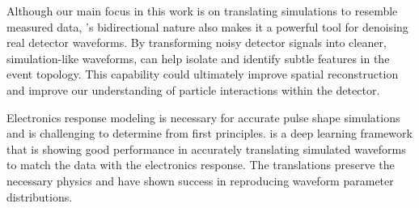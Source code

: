 Although our main focus in this work is on translating simulations to resemble measured data, {\cpunet}’s bidirectional nature also makes it a powerful tool for denoising real detector waveforms. By transforming noisy detector signals into cleaner, simulation-like waveforms, {\cpunet} can help isolate and identify subtle features in the event topology. This capability could ultimately improve spatial reconstruction and improve our understanding of particle interactions within the detector.

Electronics response modeling is necessary for accurate pulse shape simulations and is challenging to determine from first principles. {\cpunet} is a deep learning framework that is showing good performance in accurately translating simulated waveforms to match the data with the electronics response. The translations preserve the necessary physics and have shown success in reproducing waveform parameter distributions.
